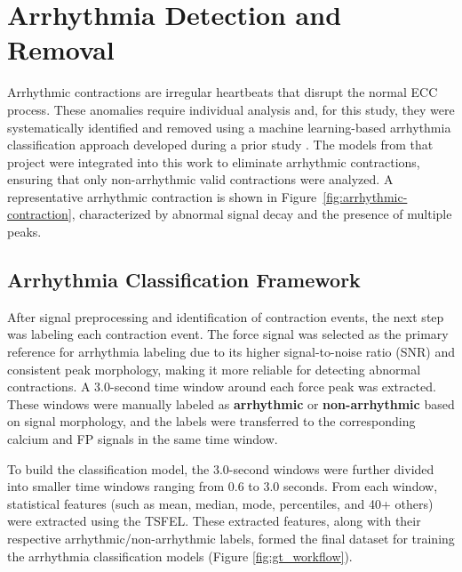 \documentclass{report}
\begin{document}
    
   \section{Arrhythmia Detection and Removal}
        \label{sec:arrythmia}
        Arrhythmic contractions are irregular heartbeats that disrupt the normal ECC process. These anomalies require individual analysis and, for this study, they were systematically identified and removed using a machine learning-based arrhythmia classification approach developed during a prior study \cite{Sarwar2024}. The models from that project were integrated into this work to eliminate arrhythmic contractions, ensuring that only non-arrhythmic valid contractions were analyzed. A representative arrhythmic contraction is shown in Figure~\ref{fig:arrhythmic-contraction}, characterized by abnormal signal decay and the presence of multiple peaks.
        
            \subsection{Arrhythmia Classification Framework}
            
            After signal preprocessing and identification of contraction events, the next step was labeling each contraction event. The force signal was selected as the primary reference for arrhythmia labeling due to its higher signal-to-noise ratio (SNR) and consistent peak morphology, making it more reliable for detecting abnormal contractions. A 3.0-second time window around each force peak was extracted. These windows were manually labeled as \textbf{arrhythmic} or \textbf{non-arrhythmic} based on signal morphology, and the labels were transferred to the corresponding calcium and FP signals in the same time window.
            
            To build the classification model, the 3.0-second windows were further divided into smaller time windows ranging from 0.6 to 3.0 seconds. From each window, statistical features (such as mean, median, mode, percentiles, and 40+ others) were extracted using the TSFEL. These extracted features, along with their respective arrhythmic/non-arrhythmic labels, formed the final dataset for training the arrhythmia classification models (Figure \ref{fig:gt_workflow}).
\end{document}
